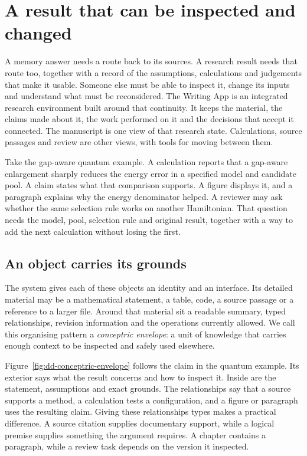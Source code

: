 \section{A result that can be inspected and changed}
\label{section:the-backend-objects-authority-and-revision}

A memory answer needs a route back to its sources. A research result needs that route too, together with a record of the assumptions, calculations and judgements that make it usable. Someone else must be able to inspect it, change its inputs and understand what must be reconsidered. The Writing App is an integrated research environment built around that continuity. It keeps the material, the claims made about it, the work performed on it and the decisions that accept it connected. The manuscript is one view of that research state. Calculations, source passages and review are other views, with tools for moving between them.

Take the gap-aware quantum example. A calculation reports that a gap-aware enlargement sharply reduces the energy error in a specified model and candidate pool. A claim states what that comparison supports. A figure displays it, and a paragraph explains why the energy denominator helped. A reviewer may ask whether the same selection rule works on another Hamiltonian. That question needs the model, pool, selection rule and original result, together with a way to add the next calculation without losing the first.

\subsection{An object carries its grounds}
The system gives each of these objects an identity and an interface. Its detailed material may be a mathematical statement, a table, code, a source passage or a reference to a larger file. Around that material sit a readable summary, typed relationships, revision information and the operations currently allowed. We call this organising pattern a \emph{conceptric envelope}: a unit of knowledge that carries enough context to be inspected and safely used elsewhere.

Figure~\ref{fig:dd-conceptric-envelope} follows the claim in the quantum example. Its exterior says what the result concerns and how to inspect it. Inside are the statement, assumptions and exact grounds. The relationships say that a source supports a method, a calculation tests a configuration, and a figure or paragraph uses the resulting claim. Giving these relationships types makes a practical difference. A source citation supplies documentary support, while a logical premise supplies something the argument requires. A chapter contains a paragraph, while a review task depends on the version it inspected.

